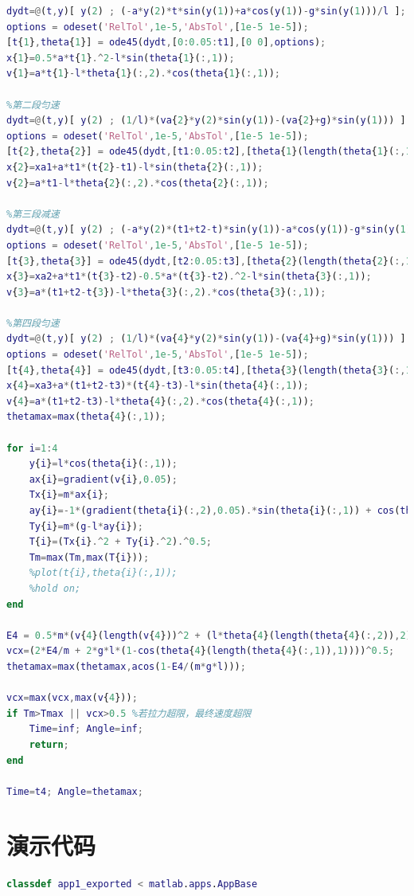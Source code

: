 \documentclass[withoutpreface,bwprint]{cumcmthesis} %
\begin{document}
\begin{appendices}
\begin{lstlisting}[language=matlab]
%第一段加速
dydt=@(t,y)[ y(2) ; (-a*y(2)*t*sin(y(1))+a*cos(y(1))-g*sin(y(1)))/l ];
options = odeset('RelTol',1e-5,'AbsTol',[1e-5 1e-5]);
[t{1},theta{1}] = ode45(dydt,[0:0.05:t1],[0 0],options);
x{1}=0.5*a*t{1}.^2-l*sin(theta{1}(:,1));
v{1}=a*t{1}-l*theta{1}(:,2).*cos(theta{1}(:,1));

%第二段匀速
dydt=@(t,y)[ y(2) ; (1/l)*(va{2}*y(2)*sin(y(1))-(va{2}+g)*sin(y(1))) ];
options = odeset('RelTol',1e-5,'AbsTol',[1e-5 1e-5]);
[t{2},theta{2}] = ode45(dydt,[t1:0.05:t2],[theta{1}(length(theta{1}(:,1)),1) theta{1}(length(theta{1}(:,2)),2)],options);
x{2}=xa1+a*t1*(t{2}-t1)-l*sin(theta{2}(:,1));
v{2}=a*t1-l*theta{2}(:,2).*cos(theta{2}(:,1));

%第三段减速
dydt=@(t,y)[ y(2) ; (-a*y(2)*(t1+t2-t)*sin(y(1))-a*cos(y(1))-g*sin(y(1)))/l ];
options = odeset('RelTol',1e-5,'AbsTol',[1e-5 1e-5]);
[t{3},theta{3}] = ode45(dydt,[t2:0.05:t3],[theta{2}(length(theta{2}(:,1)),1) theta{2}(length(theta{2}(:,2)),2)],options);
x{3}=xa2+a*t1*(t{3}-t2)-0.5*a*(t{3}-t2).^2-l*sin(theta{3}(:,1));
v{3}=a*(t1+t2-t{3})-l*theta{3}(:,2).*cos(theta{3}(:,1));

%第四段匀速
dydt=@(t,y)[ y(2) ; (1/l)*(va{4}*y(2)*sin(y(1))-(va{4}+g)*sin(y(1))) ];
options = odeset('RelTol',1e-5,'AbsTol',[1e-5 1e-5]);
[t{4},theta{4}] = ode45(dydt,[t3:0.05:t4],[theta{3}(length(theta{3}(:,1)),1) theta{3}(length(theta{3}(:,2)),2)],options);
x{4}=xa3+a*(t1+t2-t3)*(t{4}-t3)-l*sin(theta{4}(:,1));
v{4}=a*(t1+t2-t3)-l*theta{4}(:,2).*cos(theta{4}(:,1));
thetamax=max(theta{4}(:,1));

for i=1:4
    y{i}=l*cos(theta{i}(:,1));
    ax{i}=gradient(v{i},0.05);
    Tx{i}=m*ax{i};
    ay{i}=-1*(gradient(theta{i}(:,2),0.05).*sin(theta{i}(:,1)) + cos(theta{i}(:,1)).*theta{i}(:,2).^2);
    Ty{i}=m*(g-l*ay{i});
    T{i}=(Tx{i}.^2 + Ty{i}.^2).^0.5;
    Tm=max(Tm,max(T{i}));
    %plot(t{i},theta{i}(:,1));
    %hold on;
end

E4 = 0.5*m*(v{4}(length(v{4}))^2 + (l*theta{4}(length(theta{4}(:,2)),2)*sin(theta{4}(length(theta{4}(:,1)),1)))^2);
vcx=(2*E4/m + 2*g*l*(1-cos(theta{4}(length(theta{4}(:,1)),1))))^0.5;
thetamax=max(thetamax,acos(1-E4/(m*g*l)));

vcx=max(vcx,max(v{4}));
if Tm>Tmax || vcx>0.5 %若拉力超限，最终速度超限
    Time=inf; Angle=inf;
    return;
end

Time=t4; Angle=thetamax;
     \end{lstlisting}
     \section{演示代码}
     \begin{lstlisting}[language=matlab]
        classdef app1_exported < matlab.apps.AppBase


\end{lstlisting}
\end{appendices}
\end{document}
